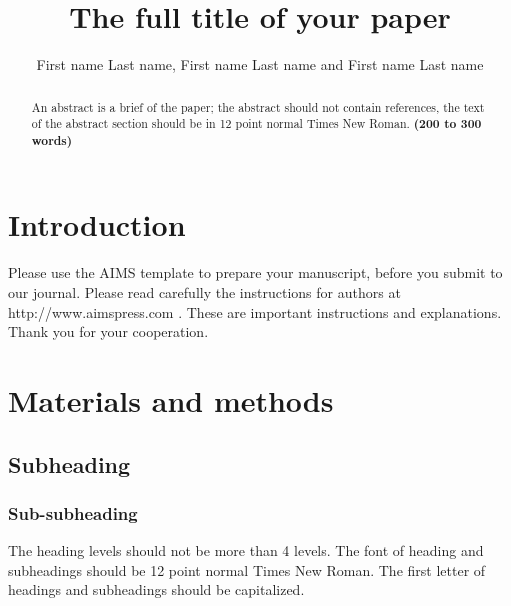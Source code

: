 \documentclass{mbe}
\numberwithin{equation}{section}
\begin{document}
\title{The full title of your paper}

\author{%
  First name Last name,
  First name Last name
  and
  First name Last name\corrauth
}


\address{%
  }


\begin{abstract}
An abstract is a brief of the paper; the abstract should not 
contain references, the text of the abstract section should be
in 12 point normal Times New Roman.
\textbf{(200 to 300 words)}
\end{abstract}


\maketitle

\section{Introduction}

Please use the AIMS template to prepare your manuscript, 
before you submit to our journal. 
Please read carefully the instructions for authors at
http://www.aimspress.com \cite{A11}. 
These are important instructions and explanations. 
Thank you for your cooperation.


\section{Materials and methods}
\subsection{Subheading}

\subsubsection{Sub-subheading}
The heading levels should not be more than 4 levels. 
The font of heading and subheadings should be 12 point 
normal Times New Roman. The first letter of headings 
and subheadings should be capitalized.
\end{document}
